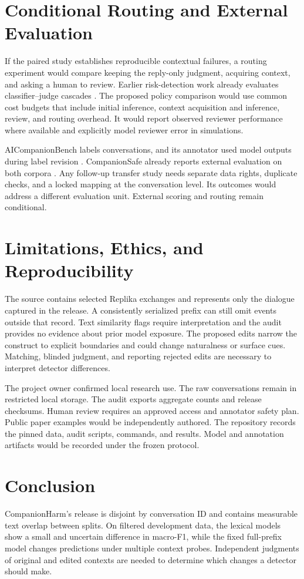 \documentclass[11pt]{article}
\begin{document}
\section{Conditional Routing and External Evaluation}

If the paired study establishes reproducible contextual failures, a routing experiment would compare keeping the reply-only judgment, acquiring context, and asking a human to review. Earlier risk-detection work already evaluates classifier--judge cascades \cite{akpinar2026risk}. The proposed policy comparison would use common cost budgets that include initial inference, context acquisition and inference, review, and routing overhead. It would report observed reviewer performance where available and explicitly model reviewer error in simulations.

AICompanionBench labels conversations, and its annotator used model outputs during label revision \cite{ren2026aicompanionbench}. CompanionSafe already reports external evaluation on both corpora \cite{companionsafe2026}. Any follow-up transfer study needs separate data rights, duplicate checks, and a locked mapping at the conversation level. Its outcomes would address a different evaluation unit. External scoring and routing remain conditional.

\section{Limitations, Ethics, and Reproducibility}

The source contains selected Replika exchanges and represents only the dialogue captured in the release. A consistently serialized prefix can still omit events outside that record. Text similarity flags require interpretation and the audit provides no evidence about prior model exposure. The proposed edits narrow the construct to explicit boundaries and could change naturalness or surface cues. Matching, blinded judgment, and reporting rejected edits are necessary to interpret detector differences.

The project owner confirmed local research use. The raw conversations remain in restricted local storage. The audit exports aggregate counts and release checksums. Human review requires an approved access and annotator safety plan. Public paper examples would be independently authored. The repository records the pinned data, audit scripts, commands, and results. Model and annotation artifacts would be recorded under the frozen protocol.

\section{Conclusion}

CompanionHarm's release is disjoint by conversation ID and contains measurable text overlap between splits. On filtered development data, the lexical models show a small and uncertain difference in macro-F1, while the fixed full-prefix model changes predictions under multiple context probes. Independent judgments of original and edited contexts are needed to determine which changes a detector should make.



\end{document}
